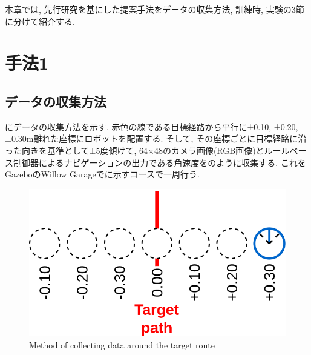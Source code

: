 
本章では, 先行研究を基にした提案手法をデータの収集方法, 訓練時, 実験の3節に分けて紹介する.

\section{手法1}

\subsection{データの収集方法}
にデータの収集方法を示す. 赤色の線である目標経路から平行に±0.10, ±0.20, ±0.30m離れた座標にロボットを配置する. そして, その座標ごとに目標経路に沿った向きを基準として±5度傾けて, 64×48のカメラ画像(RGB画像)とルールベース制御器によるナビゲーションの出力である角速度をのように収集する. これをGazeboのWillow Garageでに示すコースで一周行う.


\begin{figure}[h]
  \centering
  \includegraphics[keepaspectratio, scale=0.25]{images/old-method.png}
  \caption{Method of collecting data around the target route}
  \label{Fig:old-method}
  \end{figure}

